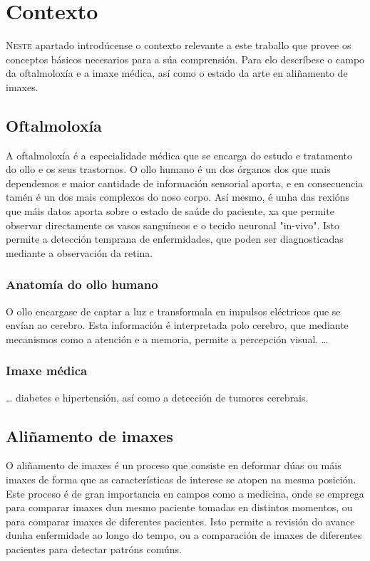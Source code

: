 \chapter{Contexto}
\label{chap:contexto}

\lettrine{N}{este} apartado introdúcense o contexto relevante a este traballo que provee os conceptos básicos necesarios para a súa comprensión.
Para elo descríbese o campo da oftalmoloxía e a imaxe médica, así como o estado da arte en aliñamento de imaxes.
\section{Oftalmoloxía}
\label{sec:Oftalmoloxía}
A oftalmoloxía é a especialidade médica que se encarga do estudo e tratamento do ollo e os seus trastornos.
 O ollo humano é un dos órganos dos que mais dependemos e maior cantidade de información sensorial aporta, e en consecuencia tamén é un dos mais complexos do noso corpo.
 Así mesmo, é unha das rexións que máis datos aporta sobre o estado de saúde do paciente, xa que permite observar directamente os vasos sanguíneos e o tecido neuronal "in-vivo".
 Isto permite a detección temprana de enfermidades, que poden ser diagnosticadas mediante a observación da retina.
\subsection{Anatomía do ollo humano}
\label{subsec:Anatomía do ollo humano}
O ollo encargase de captar a luz e transformala en impulsos eléctricos que se envían ao cerebro.
 Esta información é interpretada polo cerebro, que mediante mecanismos como a atención e a memoria, permite a percepción visual.
 \dots

\subsection{Imaxe médica}
\label{subsec:Imaxe médica}
\dots
diabetes e hipertensión, así como a detección de tumores cerebrais.

\section{Aliñamento de imaxes}
\label{sec:Aliñamento de imaxes}
O aliñamento de imaxes é un proceso que consiste en deformar dúas ou máis imaxes de forma que as características de interese se atopen na mesma posición.
Este proceso é de gran importancia en campos como a medicina, onde se emprega para comparar imaxes dun mesmo paciente tomadas en distintos momentos, ou para comparar imaxes de diferentes pacientes.
Isto permite a revisión do avance dunha enfermidade ao longo do tempo, ou a comparación de imaxes de diferentes pacientes para detectar patróns comúns.

